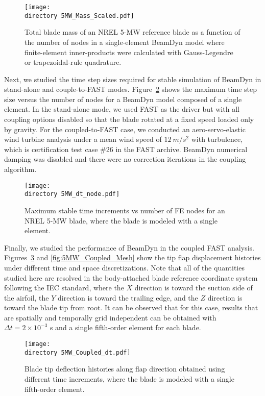 \documentclass{aiaa-tc}
\def\directory{EPSF/}
\begin{document}
\begin{figure}
    \centering
\texttt{[image: \\directory  5MW\_Mass\_Scaled.pdf]}
\caption{Total blade mass of an NREL 5-MW reference blade as a function of the number of nodes in a single-element BeamDyn model where finite-element inner-products were calculated with Gauss-Legendre or trapezoidal-rule quadrature.}
\label{fig:5MWMass}
\end{figure} 

Next, we studied the time step sizes required for stable simulation of BeamDyn in stand-alone and couple-to-FAST modes. Figure~\ref{fig:5MWdt_node} shows the maximum time step size versus the number of nodes for a BeamDyn model composed of a single element. In the stand-alone mode, we used FAST as the driver but with all coupling options disabled so that the blade rotated at a fixed speed loaded only by gravity. For the coupled-to-FAST case, we conducted an aero-servo-elastic wind turbine analysis under a mean wind speed of $12~m/s^2$ with turbulence, which is  certification test case \#26 in the FAST archive.  BeamDyn numerical damping was disabled and there were no correction iterations in the coupling algorithm.

\begin{figure}
    \centering
\texttt{[image: \\directory  5MW\_dt\_node.pdf]}
\caption{Maximum stable time increments vs number of FE nodes for an NREL 5-MW blade, where the blade is modeled with a single element.}
\label{fig:5MWdt_node}
\end{figure} 

Finally, we studied the performance of BeamDyn in the coupled FAST analysis. Figures~\ref{fig:5MW_Coupled_dt} and \ref{fig:5MW_Coupled_Mesh} show the tip flap displacement histories under different time and space discretizations. Note that all of the quantities studied here are resolved in the body-attached blade reference coordinate system following the IEC standard, where the $X$ direction is toward the suction side of the airfoil, the $Y$ direction is toward the trailing edge, and the $Z$ direction is toward the blade tip from root. It can be observed that for this case, results that are spatially and temporally grid independent can be obtained with $\Delta t = 2 \times 10^{-3}$ s  and a single fifth-order element for each blade.  

\begin{figure}
    \centering
\texttt{[image: \\directory  5MW\_Coupled\_dt.pdf]}
\caption{Blade tip deflection histories along flap direction obtained using different time increments, where the blade is modeled with a single fifth-order element.}
\label{fig:5MW_Coupled_dt}
\end{figure} 
\end{document}
